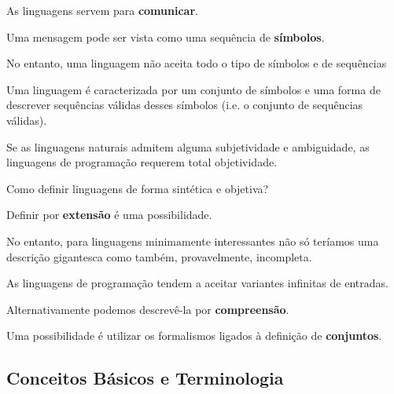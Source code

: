 \documentclass{article}
\begin{document}
\begin{flushleft}
  \item As linguagens servem para \textbf{comunicar}.
  \item Uma mensagem pode ser vista como uma sequência de
  \textbf{símbolos}.
  \item No entanto, uma linguagem não aceita todo o tipo de
  símbolos e de sequências
  \item Uma linguagem é caracterizada por um conjunto de
  símbolos e uma forma de descrever sequências válidas
  desses símbolos (i.e. o conjunto de sequências válidas).
  \item Se as linguagens naturais admitem alguma subjetividade
  e ambiguidade, as linguagens de programação requerem
  total objetividade.
  \item Como definir linguagens de forma sintética e objetiva?
  \item Definir por \textbf{extensão} é uma possibilidade.
  \item No entanto, para linguagens minimamente interessantes
  não só teríamos uma descrição gigantesca como
  também, provavelmente, incompleta.
  \item As linguagens de programação tendem a aceitar variantes
  infinitas de entradas.
  \item Alternativamente podemos descrevê-la por \textbf{compreensão}.
  \item Uma possibilidade é utilizar os formalismos ligados à
  definição de \textbf{conjuntos}.
\end{flushleft}

\subsection{Conceitos Básicos e Terminologia}
\end{document}

